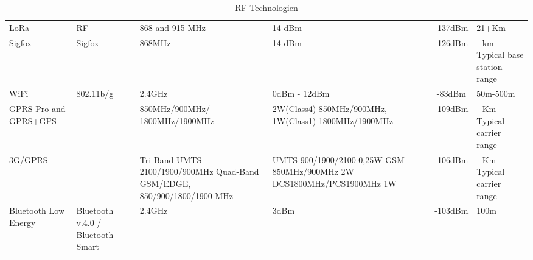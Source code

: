 \begin{landscape}
\begin{table}[H]
\begin{tabulary}{\paperwidth}{m{3cm} m{2cm} m{4cm} m{4cm} C m{2cm}}
LoRa                       & RF                                & 868 and 915 MHz                                                                                          & 14 dBm                                                                         & -137dBm             & 21+Km                             \\
Sigfox                     & Sigfox                            & 868MHz                                                                                                   & 14 dBm                                                                         & -126dBm             & - km - Typical base station range \\
WiFi                       & 802.11b/g                         & 2.4GHz                                                                                                   & 0dBm - 12dBm                                                                   & -83dBm              & 50m-500m                          \\
GPRS Pro and GPRS+GPS      & -                                 & 850MHz/900MHz/ 1800MHz/1900MHz                                                                           & 2W(Class4) 850MHz/900MHz, 1W(Class1) 1800MHz/1900MHz                           & -109dBm             & - Km - Typical carrier range      \\
3G/GPRS                    & -                                 & Tri-Band UMTS 2100/1900/900MHz Quad-Band GSM/EDGE, 850/900/1800/1900 MHz                                 & UMTS 900/1900/2100 0,25W GSM 850MHz/900MHz 2W DCS1800MHz/PCS1900MHz 1W         & -106dBm             & - Km - Typical carrier range      \\
Bluetooth Low Energy       & Bluetooth v.4.0 / Bluetooth Smart & 2.4GHz                                                                                                   & 3dBm                                                                           & -103dBm             & 100m
\end{tabulary}
\endgroup
\caption{RF-Technologien\autocite[18]{lora:TechGuide}}
\label{fig:IoT RF-Technologien}
\end{table}

\end{landscape}